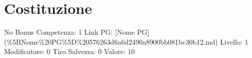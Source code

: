 \section{Costituzione}\label{costituzione}

\begin{description}
\tightlist
\item[Tags: STAT]
No Bonus Competenza: 1 Link PG: {[}Nome PG{]}
(\%5BNome\%20PG\%5D\%20576263d6a6d2490a8900bb081bc30b12.md) Livello: 1
Modificatore: 0 Tiro Salvezza: 0 Valore: 10
\end{description}
